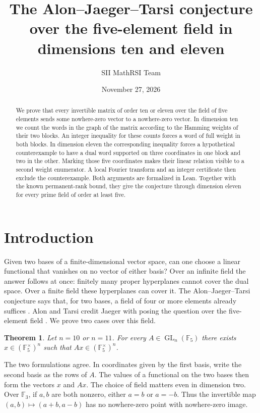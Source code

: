 \documentclass[11pt]{article}
\title{The Alon--Jaeger--Tarsi conjecture over the five-element field in dimensions ten and eleven}
\author{SII MathRSI Team}
\date{November 27, 2026}
\newtheorem{theorem}{Theorem}[section]
\theoremstyle{definition}\newtheorem{definition}[theorem]{Definition}
\theoremstyle{remark}\newtheorem{remark}[theorem]{Remark}
\newcommand{\F}{\mathbb F_5}
\DeclareMathOperator{\GL}{GL}
\begin{document}
\maketitle
\begin{abstract}
We prove that every invertible matrix of order ten or eleven over the field of five elements sends some nowhere-zero vector to a nowhere-zero vector. In dimension ten we count the words in the graph of the matrix according to the Hamming weights of their two blocks. An integer inequality for these counts forces a word of full weight in both blocks. In dimension eleven the corresponding inequality forces a hypothetical counterexample to have a dual word supported on three coordinates in one block and two in the other. Marking those five coordinates makes their linear relation visible to a second weight enumerator. A local Fourier transform and an integer certificate then exclude the counterexample. Both arguments are formalized in Lean. Together with the known permanent-rank bound, they give the conjecture through dimension eleven for every prime field of order at least five.
\end{abstract}

\section{Introduction}
Given two bases of a finite-dimensional vector space, can one choose a linear functional that vanishes on no vector of either basis? Over an infinite field the answer follows at once: finitely many proper hyperplanes cannot cover the dual space. Over a finite field these hyperplanes can cover it. The Alon--Jaeger--Tarsi conjecture says that, for two bases, a field of four or more elements already suffices \cite[Conjecture~1]{alontarsi}. Alon and Tarsi credit Jaeger with posing the question over the five-element field \cite[p.~393]{alontarsi}. We prove two cases over this field.

\begin{theorem}\label{thm:main}
Let $n=10$ or $n=11$. For every $A\in\GL_n(\F)$ there exists $x\in(\F^\times)^n$ such that $Ax\in(\F^\times)^n$.
\end{theorem}

The two formulations agree. In coordinates given by the first basis, write the second basis as the rows of $A$. The values of a functional on the two bases then form the vectors $x$ and $Ax$. The choice of field matters even in dimension two. Over $\mathbb F_3$, if $a,b$ are both nonzero, either $a=b$ or $a=-b$. Thus the invertible map $(a,b)\mapsto(a+b,a-b)$ has no nowhere-zero point with nowhere-zero image.
\end{document}
